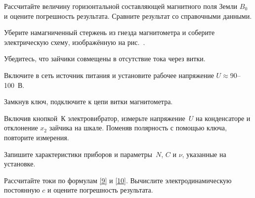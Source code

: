 \begin{lab:task}
        \item Рассчитайте величину горизонтальной составляющей магнитного поля
        Земли $B_0$ и оцените погрешность результата.
        Сравните результат со справочными данными.




        \item Уберите намагниченный стержень из гнезда магнитометра и соберите
электрическую схему, изображённую на рис.~.

        \item Убедитесь, что зайчики совмещены в отсутствие тока через витки.

        \item Включите в сеть источник питания и установите рабочее напряжение
$U\approx 90$--100~В.

        \item Замкнув ключ, подключите к цепи витки магнитометра.

        \item Включив кнопкой~К электровибратор, измерьте напряжение~$U$ на
конденсаторе и отклонение $x_2$ зайчика на шкале.
        Поменяв полярность с помощью ключа, повторите измерения.

        \item Запишите характеристики приборов и параметры~$N$, $C$ и $\nu$,
указанные на установке.

        \item Рассчитайте токи по формулам \eqref{9} и \eqref{10}.
        Вычислите электродинамическую постоянную $c$ и оцените погрешность
        результата.
\end{lab:task}



